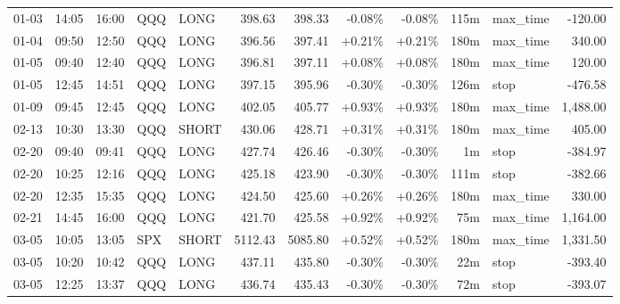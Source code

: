 \documentclass[11pt,a4paper,twoside]{article}
\begin{document}
\begin{center}
\begin{longtable}{>{\color{txtmain}}l l l l l r r r r r >{\color{txtmain}}l r}
01-03 & 14:05 & 16:00 & QQQ & LONG & 398.63 & 398.33 & \textcolor{lossred}{-0.08\%} & \textcolor{lossred}{-0.08\%} & 115m & max\_time & \textcolor{lossred}{-120.00} \\
01-04 & 09:50 & 12:50 & QQQ & LONG & 396.56 & 397.41 & \textcolor{wingreen}{+0.21\%} & \textcolor{wingreen}{+0.21\%} & 180m & max\_time & \textcolor{wingreen}{340.00} \\
01-05 & 09:40 & 12:40 & QQQ & LONG & 396.81 & 397.11 & \textcolor{wingreen}{+0.08\%} & \textcolor{wingreen}{+0.08\%} & 180m & max\_time & \textcolor{wingreen}{120.00} \\
01-05 & 12:45 & 14:51 & QQQ & LONG & 397.15 & 395.96 & \textcolor{lossred}{-0.30\%} & \textcolor{lossred}{-0.30\%} & 126m & stop & \textcolor{lossred}{-476.58} \\
01-09 & 09:45 & 12:45 & QQQ & LONG & 402.05 & 405.77 & \textcolor{wingreen}{+0.93\%} & \textcolor{wingreen}{+0.93\%} & 180m & max\_time & \textcolor{wingreen}{1,488.00} \\
02-13 & 10:30 & 13:30 & QQQ & SHORT & 430.06 & 428.71 & \textcolor{wingreen}{+0.31\%} & \textcolor{wingreen}{+0.31\%} & 180m & max\_time & \textcolor{wingreen}{405.00} \\
02-20 & 09:40 & 09:41 & QQQ & LONG & 427.74 & 426.46 & \textcolor{lossred}{-0.30\%} & \textcolor{lossred}{-0.30\%} & 1m & stop & \textcolor{lossred}{-384.97} \\
02-20 & 10:25 & 12:16 & QQQ & LONG & 425.18 & 423.90 & \textcolor{lossred}{-0.30\%} & \textcolor{lossred}{-0.30\%} & 111m & stop & \textcolor{lossred}{-382.66} \\
02-20 & 12:35 & 15:35 & QQQ & LONG & 424.50 & 425.60 & \textcolor{wingreen}{+0.26\%} & \textcolor{wingreen}{+0.26\%} & 180m & max\_time & \textcolor{wingreen}{330.00} \\
02-21 & 14:45 & 16:00 & QQQ & LONG & 421.70 & 425.58 & \textcolor{wingreen}{+0.92\%} & \textcolor{wingreen}{+0.92\%} & 75m & max\_time & \textcolor{wingreen}{1,164.00} \\
03-05 & 10:05 & 13:05 & SPX & SHORT & 5112.43 & 5085.80 & \textcolor{wingreen}{+0.52\%} & \textcolor{wingreen}{+0.52\%} & 180m & max\_time & \textcolor{wingreen}{1,331.50} \\
03-05 & 10:20 & 10:42 & QQQ & LONG & 437.11 & 435.80 & \textcolor{lossred}{-0.30\%} & \textcolor{lossred}{-0.30\%} & 22m & stop & \textcolor{lossred}{-393.40} \\
03-05 & 12:25 & 13:37 & QQQ & LONG & 436.74 & 435.43 & \textcolor{lossred}{-0.30\%} & \textcolor{lossred}{-0.30\%} & 72m & stop & \textcolor{lossred}{-393.07} \\

\end{longtable}
\end{center}
\end{document}

